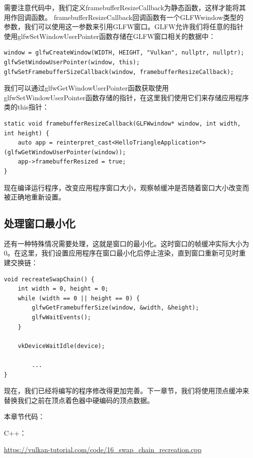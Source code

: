 \documentclass{ctexart}
\begin{document}
需要注意代码中，我们定义framebufferResizeCallback为静态函数，这样才能将其用作回调函数。
framebufferResizeCallback回调函数有一个GLFWwindow类型的参数，我们可以使用这一参数来引用GLFW窗口。GLFW允许我们将任意的指针使用glfwSetWindowUserPointer函数存储在GLFW窗口相关的数据中：

\begin{lstlisting}[language={[ANSI]C}]
window = glfwCreateWindow(WIDTH, HEIGHT, "Vulkan", nullptr, nullptr);
glfwSetWindowUserPointer(window, this);
glfwSetFramebufferSizeCallback(window, framebufferResizeCallback);
\end{lstlisting}

我们可以通过glfwGetWindowUserPointer函数获取使用glfwSetWindowUserPointer函数存储的指针，在这里我们使用它们来存储应用程序类的this指针：

\begin{lstlisting}[language={[ANSI]C}]
static void framebufferResizeCallback(GLFWwindow* window, int width, int height) {
	auto app = reinterpret_cast<HelloTriangleApplication*>(glfwGetWindowUserPointer(window));
	app->framebufferResized = true;
}
\end{lstlisting}

现在编译运行程序，改变应用程序窗口大小，观察帧缓冲是否随着窗口大小改变而被正确地重新设置。

\subsection{处理窗口最小化}

还有一种特殊情况需要处理，这就是窗口的最小化。这时窗口的帧缓冲实际大小为0。在这里，我们设置应用程序在窗口最小化后停止渲染，直到窗口重新可见时重建交换链：

\begin{lstlisting}[language={[ANSI]C}]
void recreateSwapChain() {
	int width = 0, height = 0;
	while (width == 0 || height == 0) {
		glfwGetFramebufferSize(window, &width, &height);
		glfwWaitEvents();
	}

	vkDeviceWaitIdle(device);

		...
}
\end{lstlisting}

现在，我们已经将编写的程序修改得更加完善。下一章节，我们将使用顶点缓冲来替换我们之前在顶点着色器中硬编码的顶点数据。

本章节代码：

C++：

\url{https://vulkan-tutorial.com/code/16_swap_chain_recreation.cpp}
\end{document}
